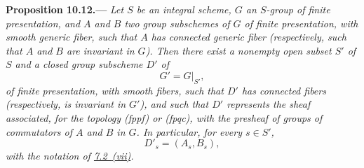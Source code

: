 

\medskip
{}\label{prop:sga3-VIB-10.12}%
\noindent\textbf{Proposition 10.12.---}
\begingroup\itshape
Let \(S\) be an integral scheme, \(G\) an \(S\)-group of finite
presentation, and \(A\) and \(B\) two group subschemes of \(G\) of
finite presentation, with smooth generic fiber, such that \(A\) has
connected generic fiber \textup{(}respectively, such that \(A\) and
\(B\) are invariant in \(G\)\textup{)}. Then there exist a nonempty
open subset \(S'\) of \(S\) and a closed group subscheme \(D'\) of
\[
  G'=G|_{S'},
\]
of finite presentation, with smooth fibers, such that \(D'\) has
connected fibers \textup{(}respectively, is invariant in
\(G'\)\textup{)}, and such that \(D'\) represents the sheaf
associated, for the topology \textup{(fppf)} or \textup{(fpqc)}, with
the presheaf of groups of commutators of \(A\) and \(B\) in \(G\). In
particular, for every \(s\in S'\),
\[
  D'_s=(A_s,B_s),
\]
with the notation of \hyperref[def:sga3-VIB-7.2-vii]{7.2~\textup{(vii)}}.
\par\endgroup

